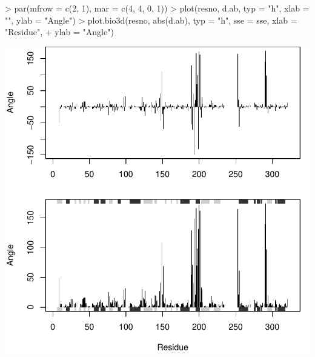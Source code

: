 \documentclass[a4paper]{article}
\begin{document}
\begin{center}
\begin{Schunk}
\begin{Sinput}
> par(mfrow = c(2, 1), mar = c(4, 4, 0, 1))
> plot(resno, d.ab, typ = "h", xlab = "", ylab = "Angle")
> plot.bio3d(resno, abs(d.ab), typ = "h", sse = sse, xlab = "Residue", 
+     ylab = "Angle")
\end{Sinput}
\end{Schunk}
\includegraphics{figs/fig-030}


\end{center}
\end{document}
